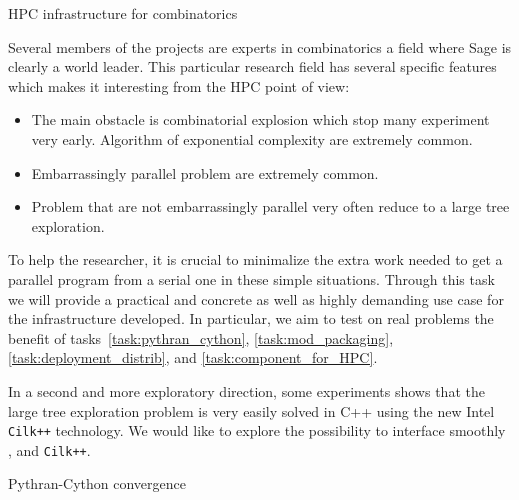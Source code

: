 \begin{Workpackage}{\thewpno}
\begin{task}{HPC infrastructure for combinatorics}
  \label{task:hpc_combi}

  Several members of the projects are experts in combinatorics a field where
  Sage is clearly a world leader. This particular research field has several
  specific features which makes it interesting from the HPC point of view:
  \begin{itemize}
  \item The main obstacle is combinatorial explosion which stop many
    experiment very early. Algorithm of exponential complexity are extremely
    common.
  \item Embarrassingly parallel problem are extremely common.
  \item Problem that are not embarrassingly parallel very often reduce to a
    large tree exploration.
  \end{itemize}
  To help the researcher, it is crucial to minimalize the extra work needed to
  get a parallel program from a serial one in these simple situations. Through
  this task we will provide a practical and concrete as well as highly
  demanding use case for the infrastructure developed. In particular, we aim
  to test on real problems the benefit of tasks~\ref{task:pythran_cython},
  \ref{task:mod_packaging}, \ref{task:deployment_distrib},
  and \ref{task:component_for_HPC}.

  In a second and more exploratory direction, some experiments shows that the
  large tree exploration problem is very easily solved in C++ using the new
  Intel \texttt{Cilk++} technology. We would like to explore the possibility to
  interface smoothly \Pythran, \Cython and \texttt{Cilk++}.

\begin{WPDeliverables}
\end{WPDeliverables}
\end{task}

\begin{task}{Pythran-Cython convergence}
  \label{task:pythran_cython}


\end{task}
\end{Workpackage}
